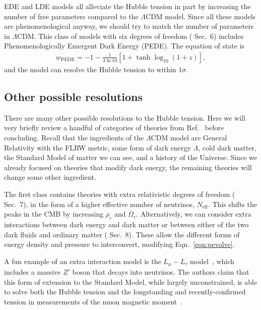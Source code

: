 \documentclass[12pt]{article}
\renewcommand{\th}[1]{\frac{1}{#1}}
\renewcommand{\L}{$\Lambda$}
\newcommand{\eff}{\text{eff}}
\newcommand{\val}[1]{\cite{DiValentino2021} Sec.~#1}
\newcommand{\DE}{\text{DE}}
\begin{document}

EDE and LDE models all alleviate the Hubble tension in part by increasing the number of free parameters compared to the \L CDM model. Since all these models are phenomenological anyway, we should try to match the number of parameters in \L CDM. This class of models with six degrees of freedom (\val{6}) includes Phenomenologically Emergent Dark Energy (PEDE). The equation of state is
\begin{align}
w_\text{PEDE} = -1 -\th{3\ln 10} [1 + \tanh \log_{10}(1 + z)],
\end{align}
and the model can resolve the Hubble tension to within $1\sigma$.

\subsection{Other possible resolutions} \label{sub:other}

There are many other possible resolutions to the Hubble tension. Here we will very briefly review a handful of categories of theories from Ref.~\cite{DiValentino2021} before concluding. Recall that the ingredients of the \L CDM model are General Relativity with the FLRW metric, some form of dark energy \L, cold dark matter, the Standard Model of matter we can see, and a history of the Universe. Since we already focused on theories that modify dark energy, the remaining theories will change some other ingredient.

The first class contains theories with extra relativistic degrees of freedom (\val{7}), in the form of a higher effective number of neutrinos, $N_\eff$. This shifts the peaks in the CMB by increasing $\rho_r$ and $\Omega_r$. Alternatively, we can consider extra interactions between dark energy and dark matter or between either of the two dark fluids and ordinary matter (\val{8}). These allow the different forms of energy density and pressure to interconvert, modifying Eqn.~\ref{eqn:pevolve}. 

A fun example of an extra interaction model is the $L_\mu-L_\tau$ model~\cite{Escudero2019}, which includes a massive $Z'$ boson that decays into neutrinos. The authors claim that this form of extension to the Standard Model, while largely unconstrained, is able to solve both the Hubble tension and the longstanding and recently-confirmed tension in measurements of the muon magnetic moment~\cite{Muon2021}.
\end{document}
